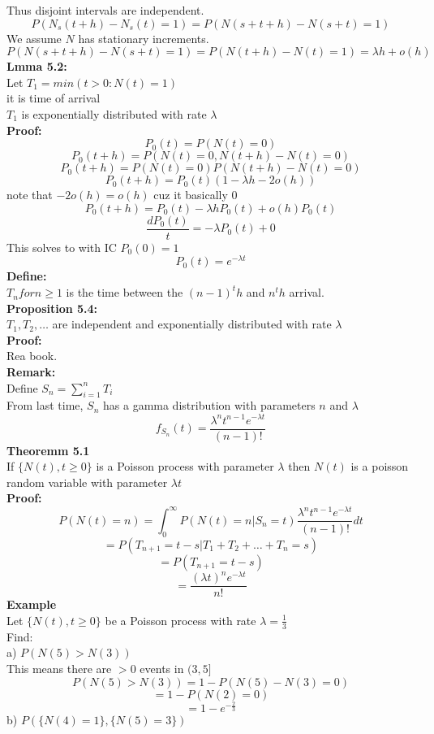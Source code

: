 \documentclass[answers,12pt,addpoints]{exam}
\begin{document}
Thus disjoint intervals are independent.\\
$$P(N_s(t+h) - N_s(t) = 1) = P(N(s+t+h) - N(s+t) = 1) $$
We assume $N$ has stationary increments.\\
$$P(N(s+t+h) - N(s+t) = 1) = P(N(t+h) - N(t) = 1) = \lambda h + o(h)$$
\textbf{Lmma 5.2:}\\
Let $T_1 = min(t > 0 : N(t) = 1)$\\
it is time of arrival\\
$T_1$ is exponentially distributed with rate $\lambda$\\
\textbf{Proof:}\\
$$P_0(t) = P(N(t) = 0)$$
$$P_0(t+h) = P(N(t) = 0 , N(t+h) - N(t) = 0) $$
$$P_0(t+h) = P(N(t) = 0)P(N(t+h) - N(t) = 0)$$
$$P_0(t+h) = P_0(t)(1 - \lambda h - 2o(h))$$
note that $-2o(h) = o(h)$ cuz it basically 0 
$$P_0(t+h) = P_0(t) - \lambda h P_0(t) + o(h)P_0(t)$$
$$\frac{d P_0(t)}{t} = -\lambda P_0(t) + 0$$
This solves to with IC $P_0(0) = 1$ 
$$P_0(t) = e^{-\lambda t}$$
\textbf{Define:}\\
$T_n for n \geq 1$ is the time between the $(n-1)^th$ and $n^th$ arrival.\\
\textbf{Proposition 5.4:}\\
$T_1, T_2, \dots$ are independent and exponentially distributed with rate $\lambda$\\
\textbf{Proof:}\\
Rea book.\\ 
\textbf{Remark:}\\
Define $S_n = \sum_{i=1}^{n} T_i$\\
From last time, $S_n$ has a gamma distribution with parameters $n$ and $\lambda$\\
$$ f_{S_n}(t) = \frac{\lambda^n t^{n-1} e^{-\lambda t}}{(n-1)!}$$
\textbf{Theoremm 5.1}\\
If $\{N(t), t \geq 0\}$ is a Poisson process with parameter $\lambda$ then $N(t)$ is a poisson random variable with parameter $\lambda t$\\
\textbf{Proof:}\\
$$P(N(t) = n) =  \int_0^{\infty} P(N(t) = n | S_n = t) \frac{\lambda^n t^{n-1} e^{-\lambda t}}{(n-1)!} dt$$
$$ = P(T_{n+1} = t-s | T_1 + T_2 + \dots + T_n = s) $$
$$ = P(T_{n+1} = t-s) $$
$$ = \frac{(\lambda t)^n e^{-\lambda t}}{n!}$$
\textbf{Example}\\
Let $\{ N(t), t \geq 0\}$ be a Poisson process with rate $\lambda = \frac{1}{3}$\\
Find:\\
a) $P(N(5) > N(3))$\\
This means there are $> 0$ events in $(3,5]$\\
$$P(N(5) > N(3)) = 1 - P(N(5) - N(3) = 0)$$
$$ = 1 - P(N(2) = 0)$$
$$ = 1 - e^{-\frac{2}{3}}$$
b) $P(\{N(4) = 1\}, \{N(5) = 3\})$\\
\end{document}
